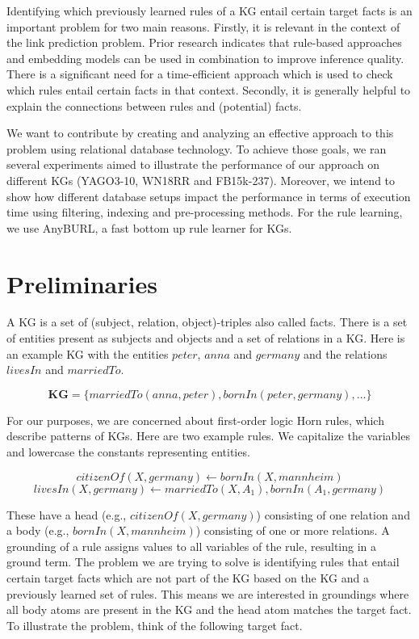 \documentclass[english]{lni}
\begin{document}
Identifying which previously learned rules of a KG entail certain target facts is an important problem for two main reasons. Firstly, it is relevant in the context of the link prediction problem. Prior research indicates that rule-based approaches and embedding models can be used in combination to improve inference quality.\cite{RuleEmbeddingCombination1}\cite{RuleEmbeddingCombination2} There is a significant need for a time-efficient approach which is used to check which rules entail certain facts in that context. Secondly, it is generally helpful to explain the connections between rules and (potential) facts.


We want to contribute by creating and analyzing an effective approach to this problem using relational database technology. To achieve those goals, we ran several experiments aimed to illustrate the performance of our approach on different KGs (YAGO3-10, WN18RR and FB15k-237). Moreover, we intend to show how different database setups impact the performance in terms of execution time using filtering, indexing and pre-processing methods. For the rule learning, we use AnyBURL, a fast bottom up rule learner for KGs.\cite{AnyBURL19}

\section{Preliminaries} 
A KG is a set of (subject, relation, object)-triples also called facts. There is a set of entities present as subjects and objects and a set of relations in a KG. Here is an example KG with the entities \(peter\), \(anna\) and \(germany\) and the relations \(livesIn\) and \(marriedTo\).

\[\textbf{KG} = \{marriedTo(anna, peter), bornIn(peter, germany), …\}\]

For our purposes, we are concerned about first-order logic Horn rules, which describe patterns of KGs. Here are two example rules. We capitalize the variables and lowercase the constants representing entities.

\begin{equation} \label{eq:rule_1}
citizenOf(X, germany) \leftarrow bornIn(X, mannheim) 
\end{equation} \label{eq:rule_2}
\begin{equation}
livesIn(X, germany) \leftarrow marriedTo(X, A_1), bornIn(A_1, germany)
\end{equation}

These have a head (e.g., \(citizenOf(X, germany)\)) consisting of one relation and a body (e.g., \(bornIn(X, mannheim)\)) consisting of one or more relations. A grounding of a rule assigns values to all variables of the rule, resulting in a ground term. The problem we are trying to solve is identifying rules that entail certain target facts which are not part of the KG based on the KG and a previously learned set of rules. This means we are interested in groundings where all body atoms are present in the KG and the head atom matches the target fact. To illustrate the problem, think of the following target fact.
\end{document}
